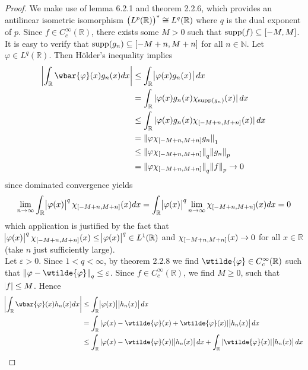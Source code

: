 \begin{enumerate}[label = \textbf{Exercise \arabic*.},wide = 0pt, itemsep = 1.5ex]
		\begin{proof}
			We make use of lemma 6.2.1 and theorem 2.2.6, which provides an antilinear isometric isomorphism $\del[1]{L^p(\mathbb{R})}^* \cong L^q(\mathbb{R})$ where $q$ is the dual exponent of $p$. Since $f \in C_c^\infty(\mathbb{R})$, there exists some $M > 0$ such that $\supp(f) \subseteq \intcc{-M,M}$. It is easy to verify that $\supp(g_n) \subseteq \intcc{-M + n, M + n}$ for all $n \in \mathbb{N}$. Let $\varphi \in L^q(\mathbb{R})$. Then H\"older's inequality implies  
			\begin{align*}
				\abs[3]{\int_\mathbb{R} \wbar{\varphi}(x)g_n(x)dx} &\leq \int_\mathbb{R} \abs{\varphi(x)g_n(x)}dx\\
				&= \int_\mathbb{R} \abs[0]{\varphi(x)g_n(x)\chi_{\supp(g_n)}(x)}dx\\
				&\leq \int_\mathbb{R}\abs[0]{\varphi(x)g_n(x)\chi_{\intcc{-M + n,M + n}}(x)}dx\\
				&= \norm[0]{\varphi \chi_{\intcc{-M + n,M + n}}g_n}_1\\
				&\leq \norm[0]{\varphi\chi_{\intcc{-M+n,M+n}}}_q\norm{g_n}_p\\
				&=\norm[0]{\varphi\chi_{\intcc{-M+n,M+n}}}_q\norm{f}_p \to 0
			\end{align*}
			\noindent since dominated convergence yields
			\begin{equation*}
				\lim_{n \to \infty} \int_\mathbb{R} \abs{\varphi(x)}^q \chi_{\intcc{-M + n,M + n}}(x) dx = \int_\mathbb{R} \abs{\varphi(x)}^q \lim_{n \to \infty}\chi_{\intcc{-M + n,M + n}}(x) dx = 0
			\end{equation*}
			\noindent which application is justified by the fact that $ \abs{\varphi(x)}^q \chi_{\intcc{-M + n,M + n}}(x) \leq \abs{\varphi(x)}^q \in L^1(\mathbb{R})$ and $\chi_{\intcc{-M + n,M + n}}(x) \to 0$ for all $x \in \mathbb{R}$ (take $n$ just sufficiently large).\\
			Let $\varepsilon > 0$. Since $1 < q < \infty$, by theorem 2.2.8 we find $\wtilde{\varphi} \in C^\infty_c(\mathbb{R})$ such that $\norm[0]{\varphi - \wtilde{\varphi}}_q \leq \varepsilon$. Since $f \in C_c^\infty(\mathbb{R})$, we find $M \geq 0$, such that $\abs{f} \leq M$. Hence
			\begin{align*}
				\abs[3]{\int_\mathbb{R}\wbar{\varphi}(x)h_n(x)dx} &\leq \int_\mathbb{R} \abs{\varphi(x)} \abs{h_n(x)}dx\\
				&= \int_\mathbb{R} \abs[0]{\varphi(x) - \wtilde{\varphi}(x) + \wtilde{\varphi}(x)} \abs{h_n(x)}dx\\
				&\leq \int_\mathbb{R} \abs[0]{\varphi(x) - \wtilde{\varphi}(x)}\abs{h_n(x)}dx + \int_\mathbb{R}\abs[0]{\wtilde{\varphi}(x)}\abs{h_n(x)}dx\\

\end{align*}
\end{proof}
\end{enumerate}
